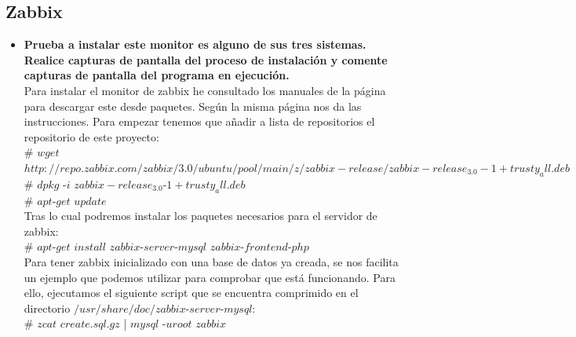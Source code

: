 \subsection{Zabbix}
\begin{itemize}
	\item \textbf{Prueba a instalar este monitor es alguno de sus tres sistemas. Realice capturas de pantalla del proceso de instalación y comente capturas de pantalla del programa en ejecución.}\\
	
	Para instalar el monitor de zabbix he consultado los manuales de la página\cite{zabbix} para descargar este desde paquetes. Según la misma página nos da las instrucciones. Para empezar tenemos que añadir a lista de repositorios el repositorio de este proyecto:\\
	
	# $wget$ $http://repo.zabbix.com/zabbix/3.0/ubuntu/pool/main/z/zabbix-release/zabbix-release_3.0-1+trusty_all.deb$\\
	# $dpkg$ -$i$ $zabbix-release_3.0$-$1+trusty_all.deb$\\
	# $apt$-$get$ $update$\\
	
	Tras lo cual podremos instalar los paquetes necesarios para el servidor de zabbix:\\
	
	# $apt$-$get$ $install$ $zabbix$-$server$-$mysql$ $zabbix$-$frontend$-$php$\\
	
	Para tener zabbix inicializado con una base de datos ya creada, se nos facilita un ejemplo que podemos utilizar para comprobar que está funcionando. Para ello, ejecutamos el siguiente script que se encuentra comprimido en el directorio $/usr/share/doc/zabbix$-$server$-$mysql$:\\
	
	# $zcat$ $create.sql.gz$ | $mysql$ -$uroot$ $zabbix$\\
	
	
	
	 
\end{itemize}


